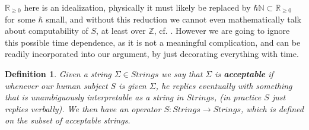\documentclass[9pt,twocolumn,twoside,lineno]{pnas-new}
\numberwithin{equation}{section}
\newtheorem{definition}[equation]{Definition}
\theoremstyle{definition}
\theoremstyle{remark}
\begin{document}
$\mathbb{R} _{\geq 0} $ here is an idealization, physically it must likely be replaced by $\hbar \mathbb{N} \subset \mathbb{R} _{\geq 0}$ for some $\hbar$ small, and without this reduction we cannot even mathematically talk about computability of $S$, at least over $\mathbb{Z}$, cf. \cite{citeBlumShubSmalen}. However we are going to ignore this possible time dependence, 
 as it is not a meaningful complication, and can be readily incorporated into our argument, by just decorating everything with time.
\begin{definition} Given a string $\Sigma \in Strings$ we say that $\Sigma$ is \textbf{\emph{acceptable}} if whenever our human subject $S$ is given $\Sigma$, he replies eventually with something that is unambiguously interpretable as a string in $Strings$, (in practice $S$ just replies verbally). We then have an operator $S: Strings \to Strings$, which is defined on the subset of acceptable strings.
\end{definition}
\end{document}
